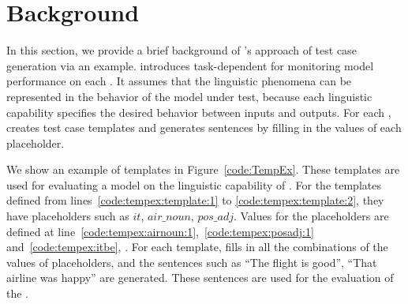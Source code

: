 \section{Background}
\label{sec:background}




In this section, we provide a brief background of \Cklst's approach of test case generation
 via an example.
\Cklst
introduces task-dependent \lcs for monitoring model performance on
each \lc. It assumes that the linguistic phenomena can be represented
in the behavior of the model under test, because each linguistic capability specifies the desired behavior between inputs and outputs. For each \lc, \Cklst creates
test case templates and generates sentences by filling in the values of
each placeholder.

We show an example of \Cklst templates in
Figure~\ref{code:TempEx}. These templates are used for
evaluating a \sa model on the linguistic capability of \SareqExThree.
For the templates defined
from lines~\ref{code:tempex:template:1} to \ref{code:tempex:template:2}, they
have placeholders such as ${it}$, ${air\_noun}$, ${pos\_adj}$. Values
for the placeholders are defined at
line~\ref{code:tempex:airnoun:1},~\ref{code:tempex:posadj:1} and~\ref{code:tempex:itbe}, .
For each template, \Cklst fills in all the combinations of the
values of placeholders, and
the sentences such as ``The flight is good'', ``That
airline was happy'' are generated. These sentences are used for the evaluation
of the \lc.

